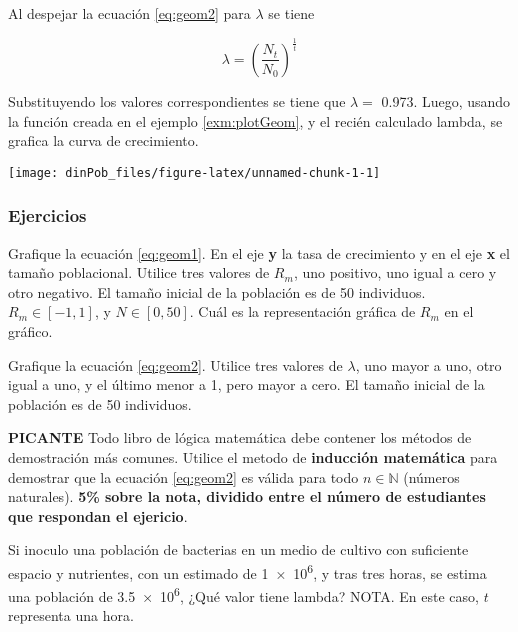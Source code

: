 \documentclass[12pt,letterpaper,]{book}
\let\BeginKnitrBlock\begin \let\EndKnitrBlock\end
\begin{document}
Al despejar la ecuación \eqref{eq:geom2} para \(\lambda\) se tiene

\[
\lambda = \left( \frac{N_t}{N_0} \right)^\frac{1}{t}
\]

Substituyendo los valores correspondientes se tiene que \(\lambda =\)
\num{ 0.973 }. Luego, usando la función creada en el ejemplo
\ref{exm:plotGeom}, y el recién calculado lambda, se grafica la curva de
crecimiento.

\begin{center}\texttt{[image: dinPob\_files/figure-latex/unnamed-chunk-1-1]} \end{center}

\subsubsection{Ejercicios}\label{ejercicios}

\BeginKnitrBlock{exercise}
\protect\hypertarget{exr:plotGeomGrowth}{}{\label{exr:plotGeomGrowth}
}Grafique la ecuación \eqref{eq:geom1}. En el eje \textbf{y} la tasa de
crecimiento y en el eje \textbf{x} el tamaño poblacional. Utilice tres
valores de \(R_m\), uno positivo, uno igual a cero y otro negativo. El
tamaño inicial de la población es de 50 individuos.
\(R_m \in \left[ -1, 1 \right]\), y \(N \in \left[ 0, 50 \right]\). Cuál
es la representación gráfica de \(R_m\) en el gráfico.
\EndKnitrBlock{exercise}

\BeginKnitrBlock{exercise}
\protect\hypertarget{exr:plotgeomGrowth2}{}{\label{exr:plotgeomGrowth2}
}Grafique la ecuación \eqref{eq:geom2}. Utilice tres valores de
\(\lambda\), uno mayor a uno, otro igual a uno, y el último menor a 1,
pero mayor a cero. El tamaño inicial de la población es de 50
individuos.
\EndKnitrBlock{exercise}

\BeginKnitrBlock{exercise}
\protect\hypertarget{exr:GeomGrowthMathInduction}{}{\label{exr:GeomGrowthMathInduction}
}\textbf{PICANTE} Todo libro de lógica matemática debe contener los
métodos de demostración más comunes. Utilice el metodo de
\textbf{inducción matemática} para demostrar que la ecuación
\eqref{eq:geom2} es válida para todo \(n \in \mathbb{N}\) (números
naturales). \textbf{5\% sobre la nota, dividido entre el número de
estudiantes que respondan el ejericio}.
\EndKnitrBlock{exercise}

\BeginKnitrBlock{exercise}
\protect\hypertarget{exr:GeomGrowthBacteria1}{}{\label{exr:GeomGrowthBacteria1}
}Si inoculo una población de bacterias en un medio de cultivo con
suficiente espacio y nutrientes, con un estimado de
\SI{1e6}{}, y tras tres horas, se estima una población
de \SI{3.5e6}{}, ¿Qué valor tiene lambda? NOTA. En este
caso, \(t\) representa una hora.
\EndKnitrBlock{exercise}
\end{document}
